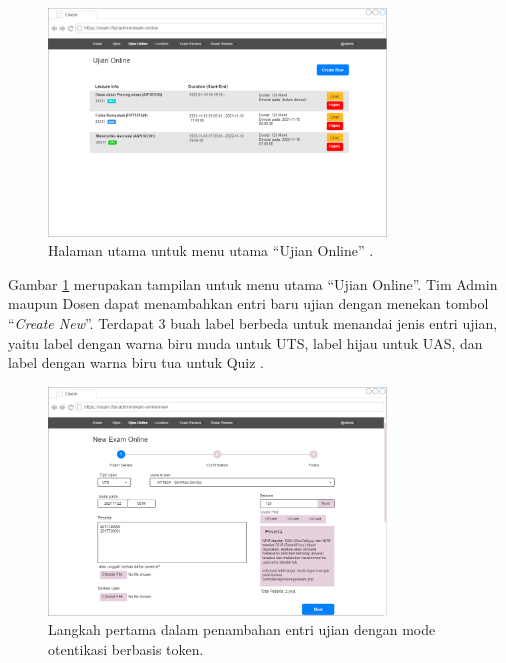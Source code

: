 \documentclass[a4paper,twoside]{article}
\begin{document}
\begin{enumerate}
\begin{itemize}
\begin{itemize}
                \begin{figure}[ht]
                    \centering
                    \includegraphics[width=0.8\textwidth]{images/ui designs/exam-online/manage-exam-index.png}
                    \caption{Halaman utama untuk menu utama ``Ujian Online'' . }
                    \label{fig:exam-online-manage-index}
                \end{figure}
		        
		        Gambar \ref{fig:exam-online-manage-index} merupakan tampilan untuk menu utama ``Ujian Online''. Tim Admin maupun Dosen dapat menambahkan entri baru ujian dengan menekan tombol ``\textit{Create New}''. Terdapat 3 buah label berbeda untuk menandai jenis entri ujian, yaitu label dengan warna biru muda untuk UTS, label hijau untuk UAS, dan label dengan warna biru tua untuk Quiz .
		        
		        \newpage
                \begin{figure}[H]
                    \centering
                    \includegraphics[width=0.8\textwidth]{images/ui designs/exam-online/manage-step-1.png}
                    \caption{Langkah pertama dalam penambahan entri ujian dengan mode otentikasi berbasis token. }
                    \label{fig:exam-online-manage-create-step1}
                \end{figure}
		        

\end{itemize}
\end{itemize}
\end{enumerate}
\end{document}
